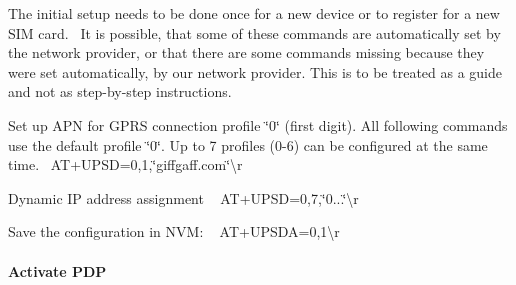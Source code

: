 The initial setup needs to be done once for a new device or to register for a new S\+IM card.~\newline
 It is possible, that some of these commands are automatically set by the network provider, or that there are some commands missing because they were set automatically, by our network provider. This is to be treated as a guide and not as step-\/by-\/step instructions.~\newline

\begin{DoxyEnumerate}
\item Set up A\+PN for G\+P\+RS connection profile \char`\"{}0\char`\"{} (first digit). All following commands use the default profile \char`\"{}0\char`\"{}. Up to 7 profiles (0-\/6) can be configured at the same time.~\newline
 {\ttfamily A\+T+\+U\+P\+SD=0,1,\char`\"{}giffgaff.\+com\char`\"{}\textbackslash{}r}~\newline

\end{DoxyEnumerate}
\begin{DoxyEnumerate}
\item Dynamic IP address assignment ~\newline
 {\ttfamily A\+T+\+U\+P\+SD=0,7,\char`\"{}0...\char`\"{}\textbackslash{}r}~\newline

\end{DoxyEnumerate}
\begin{DoxyEnumerate}
\item Save the configuration in N\+VM\+: ~\newline
 {\ttfamily A\+T+\+U\+P\+S\+DA=0,1\textbackslash{}r} ~\newline

\end{DoxyEnumerate}

\paragraph*{Activate P\+DP}

